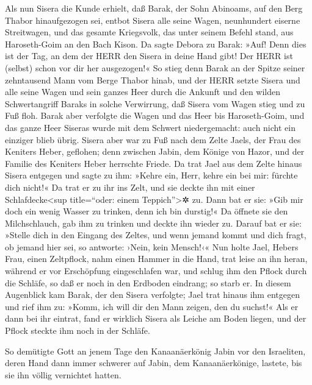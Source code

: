 Als nun Sisera die Kunde erhielt, daß Barak, der Sohn
Abinoams, auf den Berg Thabor hinaufgezogen sei, entbot
Sisera alle seine Wagen, neunhundert eiserne Streitwagen, und das
gesamte Kriegsvolk, das unter seinem Befehl stand, aus Haroseth-Goim an
den Bach Kison. Da sagte Debora zu Barak: »Auf! Denn dies
ist der Tag, an dem der HERR den Sisera in deine Hand gibt! Der HERR ist
(selbst) schon vor dir her ausgezogen!« So stieg denn Barak an der
Spitze seiner zehntausend Mann vom Berge Thabor hinab,
und der HERR setzte Sisera und alle seine Wagen und sein
ganzes Heer durch die Ankunft und den wilden Schwertangriff Baraks in
solche Verwirrung, daß Sisera vom Wagen stieg und zu Fuß floh.
Barak aber verfolgte die Wagen und das Heer bis
Haroseth-Goim, und das ganze Heer Siseras wurde mit dem Schwert
niedergemacht: auch nicht ein einziger blieb übrig.
Sisera aber war zu Fuß nach dem Zelte Jaels, der Frau des
Keniters Heber, geflohen; denn zwischen Jabin, dem Könige von Hazor, und
der Familie des Keniters Heber herrschte Friede. Da trat
Jael aus dem Zelte hinaus Sisera entgegen und sagte zu ihm: »Kehre ein,
Herr, kehre ein bei mir: fürchte dich nicht!« Da trat er zu ihr ins
Zelt, und sie deckte ihn mit einer Schlafdecke\textless sup
title=``oder: einem Teppich''\textgreater✲ zu. Dann bat
er sie: »Gib mir doch ein wenig Wasser zu trinken, denn ich bin
durstig!« Da öffnete sie den Milchschlauch, gab ihm zu trinken und
deckte ihn wieder zu. Darauf bat er sie: »Stelle dich in
den Eingang des Zeltes, und wenn jemand kommt und dich fragt, ob jemand
hier sei, so antworte: ›Nein, kein Mensch!‹« Nun holte
Jael, Hebers Frau, einen Zeltpflock, nahm einen Hammer in die Hand, trat
leise an ihn heran, während er vor Erschöpfung eingeschlafen war, und
schlug ihm den Pflock durch die Schläfe, so daß er noch in den Erdboden
eindrang; so starb er. In diesem Augenblick kam Barak,
der den Sisera verfolgte; Jael trat hinaus ihm entgegen und rief ihm zu:
»Komm, ich will dir den Mann zeigen, den du suchst!« Als er dann bei ihr
eintrat, fand er wirklich Sisera als Leiche am Boden liegen, und der
Pflock steckte ihm noch in der Schläfe.

So demütigte Gott an jenem Tage den Kanaanäerkönig Jabin
vor den Israeliten, deren Hand dann immer schwerer auf
Jabin, dem Kanaanäerkönige, lastete, bis sie ihn völlig vernichtet
hatten.

